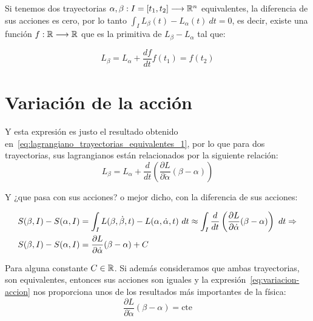 Si tenemos dos trayectorias $\alpha,\beta:I=[t_1, t_2]\longrightarrow \mathbb{R}^n$ equivalentes, la diferencia de sus acciones es cero, por lo tanto $\int_{I} L_\beta(t)-L_\alpha(t)\ dt=0$, es decir, existe una función $f:\mathbb{R}\longrightarrow \mathbb{R}$ que es la primitiva de $L_\beta-L_\alpha$ tal que:
\begin{postulate}
    \begin{subequations}
        \begin{equation}
            \label{eq:lagrangiano_trayectorias_equivalentes_1}
            L_\beta=L_\alpha+\frac{df}{dt}
        \end{equation}
        \begin{equation}
            \label{eq:lagrangiano_trayectorias_equivalentes_2}
            f(t_1)=f(t_2)
        \end{equation}
    \end{subequations}
\end{postulate}


\section{Variación de la acción}

Y esta expresión es justo el resultado obtenido en~\ref{eq:lagrangiano_trayectorias_equivalentes_1}, por lo que para dos trayectorias, sus lagrangianos están relacionados por la siguiente relación:
\begin{equation}
    \label{eq:lagrangianos_relacionados}
    L_\beta=L_\alpha+\frac{d}{dt}\left(\frac{\partial L}{\partial\dot{\alpha}}(\beta-\alpha)\right)
\end{equation}

Y ¿que pasa con sus acciones? o mejor dicho, con la diferencia de sus acciones:

\begin{equation}
    \label{eq:variacion-accion}
    \begin{align}
        S(\beta, I)-S(\alpha, I) & = \int_I L(\beta, \dot{\beta}, t)- L(\alpha, \dot{\alpha}, t)\ dt\approx\int_I\frac{d}{dt}\left(\frac{\partial L}{\partial\dot{\alpha}}(\beta-\alpha)\right)\ dt\so \\
        S(\beta, I)-S(\alpha, I) & = \frac{\partial L}{\partial\dot{\alpha}}(\beta-\alpha)+C
    \end{align}
\end{equation}

Para alguna constante $C\in\mathbb{R}$.
Si además consideramos que ambas trayectorias, son equivalentes, entonces sus acciones son iguales y la expresión~\ref{eq:variacion-accion} nos proporciona unos de los resultados más importantes de la física:
\begin{equation*}
    \frac{\partial L}{\partial\dot{\alpha}}(\beta-\alpha) = \text{cte}
\end{equation*}

